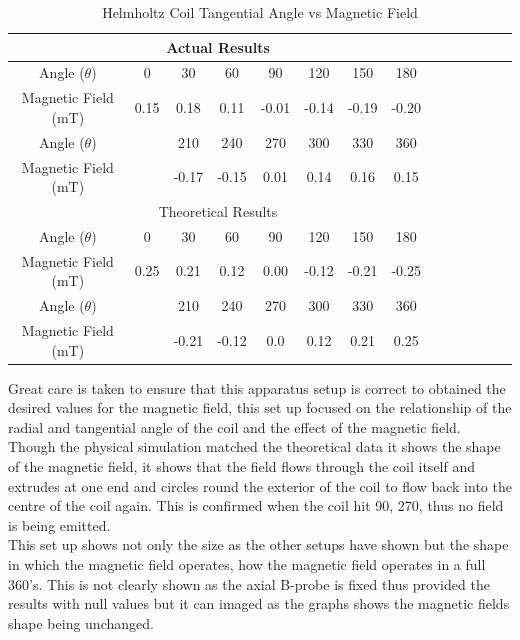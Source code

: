 \documentclass[12pt]{article}
\begin{document}
\begin{table}[H]
\begin{center}
 \begin{tabular}{|c||c|c|c|c|c|c|c|c|c|c|c|c|c|}
 \hline
 \multicolumn{8}{|c|}{Actual Results} \\
 \hline
 Angle ($\theta$) & 0 & 30 & 60 & 90 & 120 & 150 & 180 \\
 \hline
 Magnetic Field (mT) & 0.15 & 0.18 & 0.11 & -0.01 & -0.14 & -0.19 & -0.20 \\
 \hline \hline
 Angle ($\theta$) &  & 210 & 240 & 270 & 300 & 330 & 360 \\
 \hline
 Magnetic Field (mT) & & -0.17 & -0.15 & 0.01 & 0.14 & 0.16 & 0.15 \\
 \hline
 \hline
 \multicolumn{8}{|c|}{Theoretical Results} \\
 \hline
 Angle ($\theta$) & 0 & 30 & 60 & 90 & 120 & 150 & 180 \\
 \hline
 Magnetic Field (mT) & 0.25 & 0.21 & 0.12 & 0.00 & -0.12 & -0.21 & -0.25 \\
 \hline \hline
 Angle ($\theta$) &  & 210 & 240 & 270 & 300 & 330 & 360 \\
 \hline
 Magnetic Field (mT) & & -0.21 & -0.12 & 0.0 & 0.12 & 0.21 & 0.25 \\
 \hline
 \end{tabular}
 \caption{Helmholtz Coil Tangential Angle vs Magnetic Field}
 \label{Helmholtz Coil Tangential Angle Vs Magnetic Field Table}
\end{center}
\end{table}

Great care is taken to ensure that this apparatus setup is correct to obtained the desired values for the magnetic field, this set up focused on the relationship of the radial and tangential angle of the coil and the effect of the magnetic field. Though the physical simulation matched the theoretical data it shows the shape of the magnetic field, it shows that the field flows through the coil itself and extrudes at one end and circles round the exterior of the coil to flow back into the centre of the coil again. This is confirmed when the coil hit 90\textdegree, 270\textdegree, thus no field is being emitted.\\

This set up shows not only the size as the other setups have shown but the shape in which the magnetic field operates, how the magnetic field operates in a full 360\textdegree's. This is not clearly shown as the axial B-probe is fixed thus provided the results with null values but it can imaged as the graphs shows the magnetic fields shape being unchanged.
\end{document}
